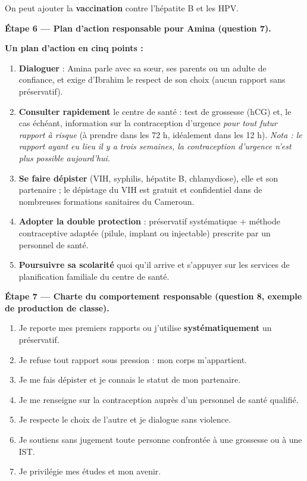 \documentclass[11pt]{article}
\begin{document}
\begin{exoresolu}
On peut ajouter la \textbf{vaccination} contre l'hépatite B et les HPV.

\textbf{Étape 6 — Plan d'action responsable pour Amina (question 7).}

\textbf{Un plan d'action en cinq points :}
\begin{enumerate}
\item \textbf{Dialoguer} : Amina parle avec sa sœur, ses parents ou un adulte de confiance, et exige d'Ibrahim le respect de son choix (aucun rapport sans préservatif).
\item \textbf{Consulter rapidement} le centre de santé : test de grossesse (hCG) et, le cas échéant, information sur la contraception d'urgence \emph{pour tout futur rapport à risque} (à prendre dans les 72 h, idéalement dans les 12 h). \emph{Nota : le rapport ayant eu lieu il y a trois semaines, la contraception d'urgence n'est plus possible aujourd'hui.}
\item \textbf{Se faire dépister} (VIH, syphilis, hépatite B, chlamydiose), elle et son partenaire ; le dépistage du VIH est gratuit et confidentiel dans de nombreuses formations sanitaires du Cameroun.
\item \textbf{Adopter la double protection} : préservatif systématique + méthode contraceptive adaptée (pilule, implant ou injectable) prescrite par un personnel de santé.
\item \textbf{Poursuivre sa scolarité} quoi qu'il arrive et s'appuyer sur les services de planification familiale du centre de santé.
\end{enumerate}

\textbf{Étape 7 — Charte du comportement responsable (question 8, exemple de production de classe).}

\begin{enumerate}
\item Je reporte mes premiers rapports ou j'utilise \textbf{systématiquement} un préservatif.
\item Je refuse tout rapport sous pression : mon corps m'appartient.
\item Je me fais dépister et je connais le statut de mon partenaire.
\item Je me renseigne sur la contraception auprès d'un personnel de santé qualifié.
\item Je respecte le choix de l'autre et je dialogue sans violence.
\item Je soutiens sans jugement toute personne confrontée à une grossesse ou à une IST.
\item Je privilégie mes études et mon avenir.
\end{enumerate}
\end{exoresolu}
\end{document}
